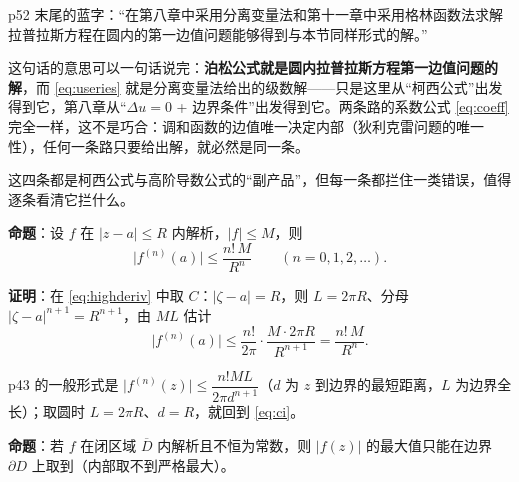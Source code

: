 
p52 末尾的蓝字：“在第八章中采用分离变量法和第十一章中采用格林函数法求解拉普拉斯方程在圆内的第一边值问题能够得到与本节同样形式的解。”

这句话的意思可以一句话说完：\textbf{泊松公式就是圆内拉普拉斯方程第一边值问题的解}，而 \eqref{eq:useries} 就是分离变量法给出的级数解——只是这里从“柯西公式”出发得到它，第八章从“$\Delta u=0$ + 边界条件”出发得到它。两条路的系数公式 \eqref{eq:coeff} 完全一样，这不是巧合：调和函数的边值唯一决定内部（狄利克雷问题的唯一性），任何一条路只要给出解，就必然是同一条。


\flowerrule


这四条都是柯西公式与高阶导数公式的“副产品”，但每一条都拦住一类错误，值得逐条看清它拦什么。


\textbf{命题}：设 $f$ 在 $|z-a|\le R$ 内解析，$|f|\le M$，则
\begin{equation}\label{eq:ci}
\bigl|f^{(n)}(a)\bigr|\le\frac{n!\,M}{R^{n}}\qquad(n=0,1,2,\dots).
\end{equation}

\textbf{证明}：在 \eqref{eq:highderiv} 中取 $C$：$|\zeta-a|=R$，则 $L=2\pi R$、分母 $|\zeta-a|^{n+1}=R^{n+1}$，由 $ML$ 估计
\[ \bigl|f^{(n)}(a)\bigr|\le\frac{n!}{2\pi}\cdot\frac{M\cdot2\pi R}{R^{n+1}}=\frac{n!\,M}{R^{n}} . \]

p43 的一般形式是 $\bigl|f^{(n)}(z)\bigr|\le\dfrac{n!ML}{2\pi d^{n+1}}$（$d$ 为 $z$ 到边界的最短距离，$L$ 为边界全长）；取圆时 $L=2\pi R$、$d=R$，就回到 \eqref{eq:ci}。



\textbf{命题}：若 $f$ 在闭区域 $\overline{D}$ 内解析且不恒为常数，则 $|f(z)|$ 的最大值只能在边界 $\partial D$ 上取到（内部取不到严格最大）。

